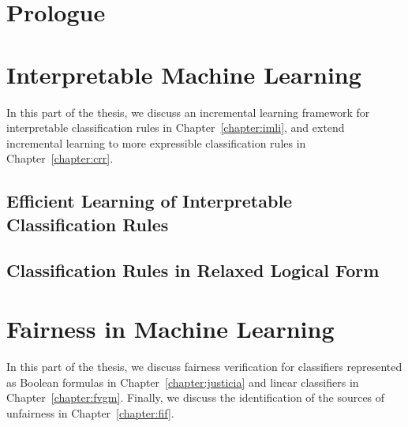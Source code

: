 \begin{mainmatter}
	\part{Prologue}
	
	
	\part{Interpretable Machine Learning}
	
	
	In this part of the thesis, we discuss  an incremental learning framework for interpretable classification rules in Chapter~\ref{chapter:imli}, and extend incremental learning to more expressible classification rules in Chapter~\ref{chapter:crr}. 
	
	\chapter{Efficient Learning of  Interpretable Classification Rules}
	
	
	
	
	
	
	
	
	
	
	\chapter{Classification Rules in Relaxed Logical Form}
	
	
	
	
	
	
	
	
	\part{Fairness in Machine Learning}
	
	In this part of the thesis, we discuss fairness verification for classifiers represented as Boolean formulas in Chapter~\ref{chapter:justicia} and linear classifiers in Chapter~\ref{chapter:fvgm}. Finally, we discuss the identification of the sources of unfairness in Chapter~\ref{chapter:fif}.


\end{mainmatter}
